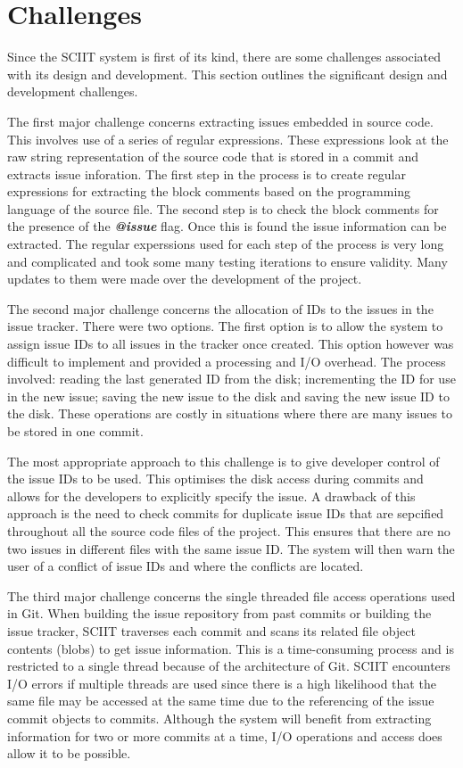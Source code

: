 \documentclass{mproj}
\begin{document}
\section{Challenges}

Since the SCIIT system is first of its kind, there are some challenges associated with its design and development. This section outlines the significant design and development challenges.

The first major challenge concerns extracting issues embedded in source code. This involves use of a series of regular expressions. These expressions look at the raw string representation of the source code that is stored in a commit and extracts issue inforation. The first step in the process is to create regular expressions for extracting the block comments based on the programming language of the source file. The second step is to check the block comments for the presence of the \textbf{\textit{@issue}} flag. Once this is found the issue information can be extracted. The regular experssions used for each step of the process is very long and complicated and took some many testing iterations to ensure validity. Many updates to them were made over the development of the project.

The second major challenge concerns the allocation of IDs to the issues in the issue tracker. There were two options. The first option is to allow the system to assign issue IDs to all issues in the tracker once created. This option however was difficult to implement and provided a processing and I/O overhead. The process involved: reading the last generated ID from the disk; incrementing the ID for use in the new issue; saving the new issue to the disk and saving the new issue ID to the disk. These operations are costly in situations where there are many issues to be stored in one commit.

The most appropriate approach to this challenge is to give developer control of the issue IDs to be used. This optimises the disk access during commits and allows for the developers to explicitly specify the issue. A drawback of this approach is the need to check commits for duplicate issue IDs that are sepcified throughout all the source code files of the project. This ensures that there are no two issues in different files with the same issue ID. The system will then warn the user of a conflict of issue IDs and where the conflicts are located.

The third major challenge concerns the single threaded file access operations used in Git. When building the issue repository from past commits or building the issue tracker, SCIIT traverses each commit and scans its related file object contents (blobs) to get issue information. This is a time-consuming process and is restricted to a single thread because of the architecture of Git. SCIIT encounters I/O errors if multiple threads are used since there is a high likelihood that the same file may be accessed at the same time due to the referencing of the issue commit objects to commits. Although the system will benefit from extracting information for two or more commits at a time, I/O operations and access does allow it to be possible. 
\end{document}

